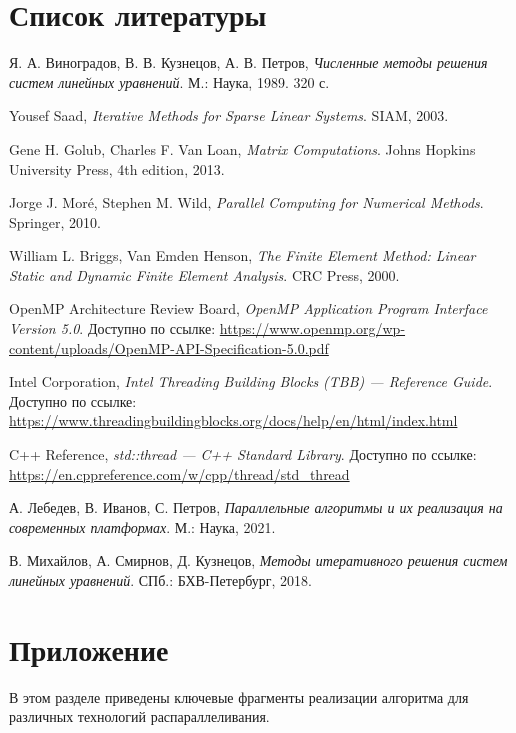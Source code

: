 \documentclass[12pt]{article}
\begin{document}
\section{Список литературы}
\begin{enumerate}
Я. А. Виноградов, В. В. Кузнецов, А. В. Петров,
\textit{Численные методы решения систем линейных уравнений}.
М.: Наука, 1989. 320 с.

Yousef Saad,
\textit{Iterative Methods for Sparse Linear Systems}.
SIAM, 2003.

Gene H. Golub, Charles F. Van Loan,
\textit{Matrix Computations}.
 Johns Hopkins University Press, 4th edition, 2013.

Jorge J. Moré, Stephen M. Wild,
\textit{Parallel Computing for Numerical Methods}.
Springer, 2010.

William L. Briggs, Van Emden Henson,
\textit{The Finite Element Method: Linear Static and Dynamic Finite Element Analysis}.
CRC Press, 2000.

OpenMP Architecture Review Board,
\textit{OpenMP Application Program Interface Version 5.0}.
Доступно по ссылке: \url{https://www.openmp.org/wp-content/uploads/OpenMP-API-Specification-5.0.pdf}

Intel Corporation,
\textit{Intel Threading Building Blocks (TBB) — Reference Guide}.
Доступно по ссылке: \url{https://www.threadingbuildingblocks.org/docs/help/en/html/index.html}

C++ Reference,
\textit{std::thread — C++ Standard Library}.
Доступно по ссылке: \url{https://en.cppreference.com/w/cpp/thread/std_thread}

А. Лебедев, В. Иванов, С. Петров,
\textit{Параллельные алгоритмы и их реализация на современных платформах}.
М.: Наука, 2021.

В. Михайлов, А. Смирнов, Д. Кузнецов,
\textit{Методы итеративного решения систем линейных уравнений}.
СПб.: БХВ-Петербург, 2018.
\end{enumerate}
\appendix
\section*{Приложение}

В этом разделе приведены ключевые фрагменты реализации алгоритма для различных технологий распараллеливания.
\end{document}
